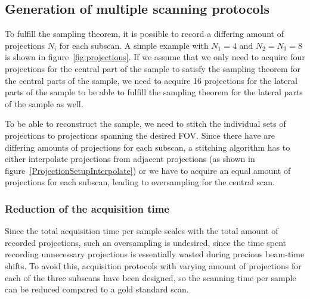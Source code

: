 \subsection{Generation of multiple scanning protocols}
\cbstart
To fulfill the sampling theorem, it is possible to record a differing amount of projections $N_{i}$ for each subscan. A simple example with $N_{1}=4$ and $N_{2}=N_{3}=8$ is shown in figure~\ref{fig:projections}. If we assume that we only need to acquire four projections for the central part of the sample to satisfy the sampling theorem for the central parts of the sample, we need to acquire 16 projections for the lateral parts of the sample to be able to fulfill the sampling theorem for the lateral parts of the sample as well.

To be able to reconstruct the sample, we need to stitch the individual sets of projections to projections spanning the desired FOV. Since there have are differing amounts of projections for each subscan, a stitching algorithm has to either interpolate projections from adjacent projections (as shown in figure~\ref{ProjectionSetupInterpolate}) or we have to acquire an equal amount of projections for each subscan, leading to oversampling for the central scan.

\begin{figure*}[htp]
	\centering
	\subfloat[]{%
		\label{subfig:ProjectionSetup}%
		}%
	\subfloat[]{%
		\label{subfig:ProjectionSetupInterpolate}%
		}%
	\caption{Setup with one central (green) and two lateral scans (red and blue, respectively). For demonstration purposes, the central scan has four projections and the lateral scans have eight projections each (all acquired over \SI{180}{\degree}). The colors of the three positions correspond to the colors shown in figure~\ref{subfig:scanning-possibilities}. : scanned projections, : scanned projections and additional interpolated projections (dashed) needed to correctly merge all projections.}
	\label{fig:projections}
\end{figure*}
\cbend

\subsubsection{Reduction of the acquisition time}
\cbstart
Since the total acquisition time per sample scales with the total amount of recorded projections, such an oversampling is undesired, since the time spent recording unnecessary projections is essentially wasted during precious beam-time shifts. To avoid this, acquisition protocols with varying amount of projections for each of the three subscans have been designed, so the scanning time per sample can be reduced compared to a gold standard scan.

